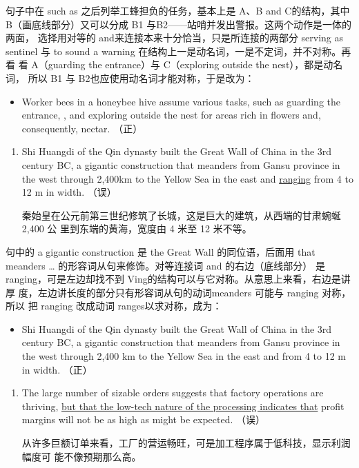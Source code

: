 句子中在 such as 之后列举工蜂担负的任务，基本上是 A、B and C的结构，其中
B（画底线部分）又可以分成 B1 与B2——站哨并发出警报。这两个动作是一体的两面，
选择用对等的 and来连接本来十分恰当，只是所连接的两部分 serving as
sentinel 与 to sound a warning 在结构上一是动名词，一是不定词，并不对称。再看
看 A（guarding the entrance）与 C（exploring outside the nest），都是动名词，
所以 B1 与 B2也应使用动名词才能对称，于是改为：
\begin{mybox}
  \begin{itemize}
  \item Worker bees in a honeybee hive assume various tasks, such as guarding
    the entrance, , and exploring outside the nest for areas rich in
    flowers and, consequently, nectar. （正）
  \end{itemize}
\end{mybox}

\begin{enumerate}[resume]
\item Shi Huangdi of the Qin dynasty built the Great Wall of China in the 3rd
  century BC, a gigantic construction that meanders from Gansu province in
  the west through 2,400km to the Yellow Sea in the east and \ul{ranging}
  from 4 to 12 m in width. （误）

  秦始皇在公元前第三世纪修筑了长城，这是巨大的建筑，从西端的甘肃蜿蜒2,400 公
  里到东端的黄海，宽度由 4 米至 12 米不等。
\end{enumerate}


句中的 a gigantic construction 是 the Great Wall 的同位语，后面用 that
meanders \ldots{} 的形容词从句来修饰。对等连接词 and 的右边（底线部分）
是ranging，可是左边却找不到 Ving的结构可以与它对称。从意思上来看，右边是讲厚
度，左边讲长度的部分只有形容词从句的动词meanders 可能与 ranging 对称，所以
把 ranging 改成动词 ranges以求对称，成为：
\begin{mybox}
  \begin{itemize}
  \item Shi Huangdi of the Qin dynasty built the Great Wall of China in the 3rd
    century BC, a gigantic construction that meanders from Gansu province in
    the west through 2,400 km to the Yellow Sea in the east and
     from 4 to 12 m in width. （正）
  \end{itemize}
\end{mybox}

\begin{enumerate}[resume]
\item The large number of sizable orders suggests that factory operations are
  thriving, \ul{but that the low-tech nature of the processing indicates
    that} profit margins will not be as high as might be expected. （误）

  从许多巨额订单来看，工厂的营运畅旺，可是加工程序属于低科技，显示利润幅度可
  能不像预期那么高。
\end{enumerate}

